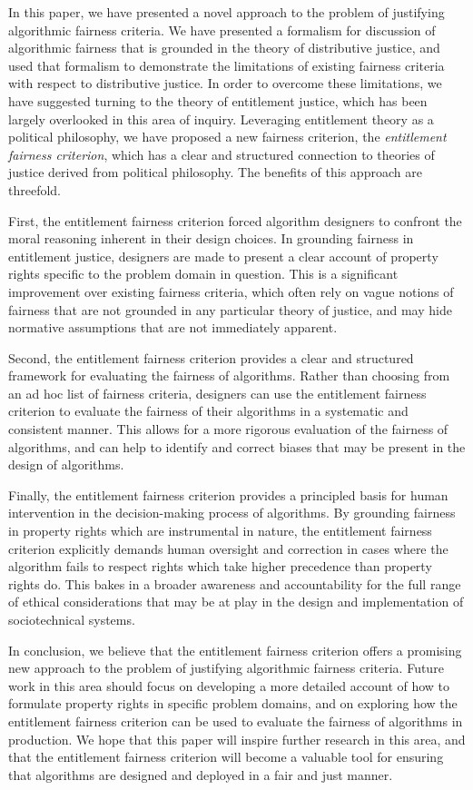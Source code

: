 In this paper, we have presented a novel approach to the problem of justifying
algorithmic fairness criteria. We have presented a formalism for discussion of
algorithmic fairness that is grounded in the theory of distributive justice, and
used that formalism to demonstrate the limitations of existing fairness criteria
with respect to distributive justice. In order to overcome these limitations, we
have suggested turning to the theory of entitlement justice, which has been
largely overlooked in this area of inquiry. Leveraging entitlement theory as a
political philosophy, we have proposed a new fairness criterion, the
\emph{entitlement fairness criterion}, which has a clear and structured 
connection to theories of justice derived from political philosophy. The
benefits of this approach are threefold.

First, the entitlement fairness criterion forced algorithm designers to confront
the moral reasoning inherent in their design choices. In grounding fairness in
entitlement justice, designers are made to present a clear account of property
rights specific to the problem domain in question. This is a significant
improvement over existing fairness criteria, which often rely on vague notions
of fairness that are not grounded in any particular theory of justice, and may
hide normative assumptions that are not immediately apparent.

Second, the entitlement fairness criterion provides a clear and structured
framework for evaluating the fairness of algorithms. Rather than choosing from
an ad hoc list of fairness criteria, designers can use the entitlement fairness
criterion to evaluate the fairness of their algorithms in a systematic and
consistent manner. This allows for a more rigorous evaluation of the fairness of
algorithms, and can help to identify and correct biases that may be present in
the design of algorithms.

Finally, the entitlement fairness criterion provides a principled basis for
human intervention in the decision-making process of algorithms. By grounding
fairness in property rights which are instrumental in nature, the entitlement
fairness criterion explicitly demands human oversight and correction in cases
where the algorithm fails to respect rights which take higher precedence than
property rights do. This bakes in a broader awareness and accountability for the
full range of ethical considerations that may be at play in the design and
implementation of sociotechnical systems.

In conclusion, we believe that the entitlement fairness criterion offers a
promising new approach to the problem of justifying algorithmic fairness
criteria. Future work in this area should focus on developing a more detailed
account of how to formulate property rights in specific problem domains, and on
exploring how the entitlement fairness criterion can be used to evaluate the
fairness of algorithms in production. We hope that this paper will inspire
further research in this area, and that the entitlement fairness criterion will
become a valuable tool for ensuring that algorithms are designed and deployed in
a fair and just manner.
